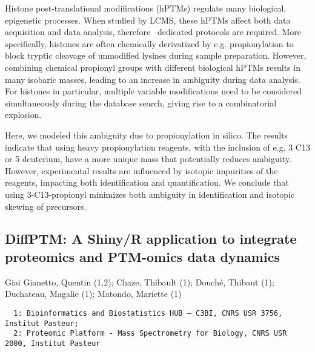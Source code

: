 {Histone post-translational modifications (hPTMs) regulate many biological, epigenetic processes. When studied by LCMS, these hPTMs affect both data acquisition and data analysis, therefore  dedicated protocols are required. More specifically, histones are often chemically derivatized by e.g. propionylation to block tryptic cleavage of unmodified lysines during sample preparation. However, combining chemical propionyl groups with different biological hPTMs results in many isobaric masses, leading to an increase in ambiguity during data analysis. For histones in particular, multiple variable modifications need to be considered simultaneously during the database search, giving rise to a combinatorial explosion.

Here, we modeled this ambiguity due to propionylation in silico. The results indicate that using heavy propionylation reagents, with the inclusion of e.g. 3 C13 or 5 deuterium, have a more unique mass that potentially reduces ambiguity. However, experimental results are influenced by isotopic impurities of the reagents, impacting both identification and quantification. We conclude that using 3-C13-propionyl minimizes both ambiguity in identification and isotopic skewing of precursors.

\pagebreak
\subsection*{\color{eubicRed} DiffPTM: A Shiny/R application to integrate proteomics and PTM-omics data dynamics}
{\color{eubicGray}Giai Gianetto, Quentin (1,2);
Chaze, Thibault (1);
Douché, Thibaut (1);
Duchateau, Magalie (1);
Matondo, Mariette (1)}
{\color{eubicGray}\begin{verbatim}
  1: Bioinformatics and Biostatistics HUB – C3BI, CNRS USR 3756, Institut Pasteur;
  2: Proteomic Platform - Mass Spectrometry for Biology, CNRS USR 2000, Institut Pasteur
\end{verbatim}}

}
